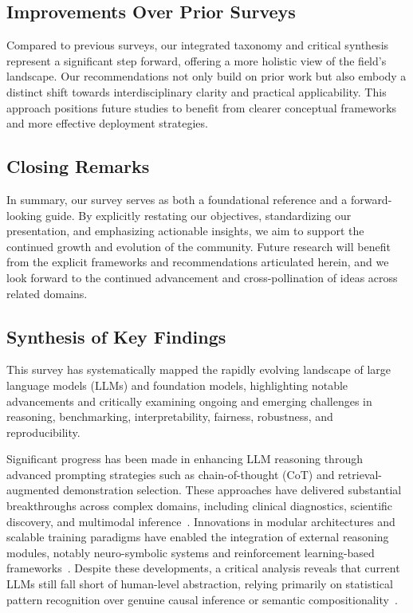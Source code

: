 \documentclass[sigconf]{acmart}
\begin{document}
\subsection{Improvements Over Prior Surveys}
Compared to previous surveys, our integrated taxonomy and critical synthesis represent a significant step forward, offering a more holistic view of the field's landscape. Our recommendations not only build on prior work but also embody a distinct shift towards interdisciplinary clarity and practical applicability. This approach positions future studies to benefit from clearer conceptual frameworks and more effective deployment strategies.

\subsection{Closing Remarks}
In summary, our survey serves as both a foundational reference and a forward-looking guide. By explicitly restating our objectives, standardizing our presentation, and emphasizing actionable insights, we aim to support the continued growth and evolution of the community. Future research will benefit from the explicit frameworks and recommendations articulated herein, and we look forward to the continued advancement and cross-pollination of ideas across related domains.

\subsection{Synthesis of Key Findings}

This survey has systematically mapped the rapidly evolving landscape of large language models (LLMs) and foundation models, highlighting notable advancements and critically examining ongoing and emerging challenges in reasoning, benchmarking, interpretability, fairness, robustness, and reproducibility.

Significant progress has been made in enhancing LLM reasoning through advanced prompting strategies such as chain-of-thought (CoT) and retrieval-augmented demonstration selection. These approaches have delivered substantial breakthroughs across complex domains, including clinical diagnostics, scientific discovery, and multimodal inference~\cite{ref23,ref38,ref47,ref58,ref61,ref78,ref86,ref87,ref89}. Innovations in modular architectures and scalable training paradigms have enabled the integration of external reasoning modules, notably neuro-symbolic systems and reinforcement learning-based frameworks~\cite{ref49,ref52,ref57,ref86,ref87,ref89}. Despite these developments, a critical analysis reveals that current LLMs still fall short of human-level abstraction, relying primarily on statistical pattern recognition over genuine causal inference or semantic compositionality~\cite{ref23,ref49,ref57}.
\end{document}
